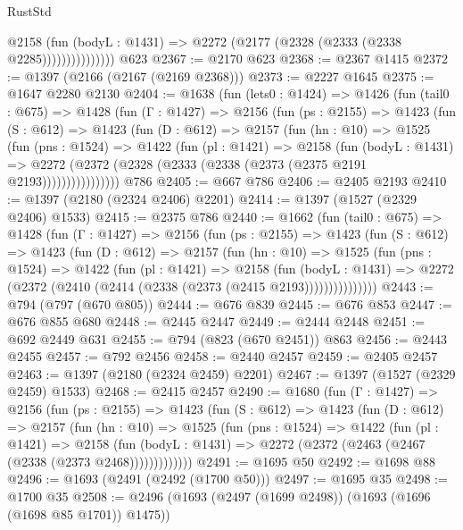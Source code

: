 \begin{lexlean}{RustStd}
\begin{coremodule}
                      @2158
                        (fun (bodyL : @1431) =>
                        @2272 (@2177 (@2328 (@2333 (@2338 @2285)))))))))))))))
    @623
@2367 := @2170 @623
@2368 := @2367 @1415
@2372 := @1397 (@2166 (@2167 (@2169 @2368)))
@2373 := @2227 @1645
@2375 := @1647 @2280 @2130
@2404 := @1638
    (fun (lets0 : @1424) =>
    @1426
      (fun (tail0 : @675) =>
      @1428
        (fun (Γ : @1427) =>
        @2156
          (fun (ps : @2155) =>
          @1423
            (fun (S : @612) =>
            @1423
              (fun (D : @612) =>
              @2157
                (fun (hn : @10) =>
                @1525
                  (fun (pns : @1524) =>
                  @1422
                    (fun (pl : @1421) =>
                    @2158
                      (fun (bodyL : @1431) =>
                      @2272 (@2372 (@2328 (@2333 (@2338 (@2373 (@2375 @2191 @2193))))))))))))))))
    @786
@2405 := @667 @786
@2406 := @2405 @2193
@2410 := @1397 (@2180 (@2324 @2406) @2201)
@2414 := @1397 (@1527 (@2329 @2406) @1533)
@2415 := @2375 @786
@2440 := @1662
    (fun (tail0 : @675) =>
    @1428
      (fun (Γ : @1427) =>
      @2156
        (fun (ps : @2155) =>
        @1423
          (fun (S : @612) =>
          @1423
            (fun (D : @612) =>
            @2157
              (fun (hn : @10) =>
              @1525
                (fun (pns : @1524) =>
                @1422
                  (fun (pl : @1421) =>
                  @2158
                    (fun (bodyL : @1431) =>
                    @2272 (@2372 (@2410 (@2414 (@2338 (@2373 (@2415 @2193)))))))))))))))
@2443 := @794 (@797 (@670 @805))
@2444 := @676 @839
@2445 := @676 @853
@2447 := @676 @855 @680
@2448 := @2445 @2447
@2449 := @2444 @2448
@2451 := @692 @2449 @631
@2455 := @794 (@823 (@670 @2451)) @863
@2456 := @2443 @2455
@2457 := @792 @2456
@2458 := @2440 @2457
@2459 := @2405 @2457
@2463 := @1397 (@2180 (@2324 @2459) @2201)
@2467 := @1397 (@1527 (@2329 @2459) @1533)
@2468 := @2415 @2457
@2490 := @1680
    (fun (Γ : @1427) =>
    @2156
      (fun (ps : @2155) =>
      @1423
        (fun (S : @612) =>
        @1423
          (fun (D : @612) =>
          @2157
            (fun (hn : @10) =>
            @1525
              (fun (pns : @1524) =>
              @1422
                (fun (pl : @1421) =>
                @2158
                  (fun (bodyL : @1431) =>
                  @2272 (@2372 (@2463 (@2467 (@2338 (@2373 @2468)))))))))))))
@2491 := @1695 @50
@2492 := @1698 @88
@2496 := @1693 (@2491 (@2492 (@1700 @50)))
@2497 := @1695 @35
@2498 := @1700 @35
@2508 := @2496 (@1693 (@2497 (@1699 @2498)) (@1693 (@1696 (@1698 @85 @1701)) @1475))

\end{coremodule}
\end{lexlean}
